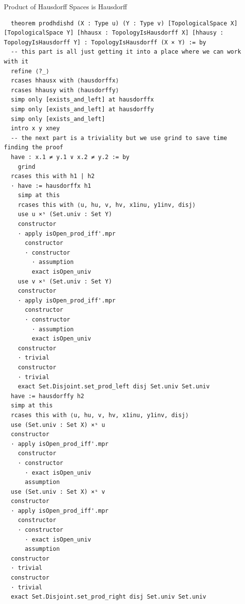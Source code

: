 \documentclass[11pt]{article}
\begin{document}
Product of Hausdorff Spaces is Hausdorff
\begin{verbatim}
  theorem prodhdishd (X : Type u) (Y : Type v) [TopologicalSpace X] [TopologicalSpace Y] [hhausx : TopologyIsHausdorff X] [hhausy : TopologyIsHausdorff Y] : TopologyIsHausdorff (X × Y) := by
  -- this part is all just getting it into a place where we can work with it
  refine ⟨?_⟩ 
  rcases hhausx with ⟨hausdorffx⟩
  rcases hhausy with ⟨hausdorffy⟩
  simp only [exists_and_left] at hausdorffx
  simp only [exists_and_left] at hausdorffy
  simp only [exists_and_left]
  intro x y xney
  -- the next part is a triviality but we use grind to save time finding the proof
  have : x.1 ≠ y.1 ∨ x.2 ≠ y.2 := by 
    grind
  rcases this with h1 | h2
  · have := hausdorffx h1  
    simp at this 
    rcases this with ⟨u, hu, v, hv, x1inu, y1inv, disj⟩
    use u ×ˢ (Set.univ : Set Y) 
    constructor
    · apply isOpen_prod_iff'.mpr
      constructor
      · constructor 
        · assumption
        exact isOpen_univ
    use v ×ˢ (Set.univ : Set Y)
    constructor
    · apply isOpen_prod_iff'.mpr
      constructor
      · constructor 
        · assumption
        exact isOpen_univ
    constructor
    · trivial 
    constructor
    · trivial
    exact Set.Disjoint.set_prod_left disj Set.univ Set.univ
  have := hausdorffy h2
  simp at this
  rcases this with ⟨u, hu, v, hv, x1inu, y1inv, disj⟩
  use (Set.univ : Set X) ×ˢ u
  constructor
  · apply isOpen_prod_iff'.mpr 
    constructor
    · constructor
      · exact isOpen_univ
      assumption
  use (Set.univ : Set X) ×ˢ v 
  constructor
  · apply isOpen_prod_iff'.mpr 
    constructor
    · constructor
      · exact isOpen_univ
      assumption
  constructor
  · trivial
  constructor
  · trivial
  exact Set.Disjoint.set_prod_right disj Set.univ Set.univ
\end{verbatim}
\end{document}
